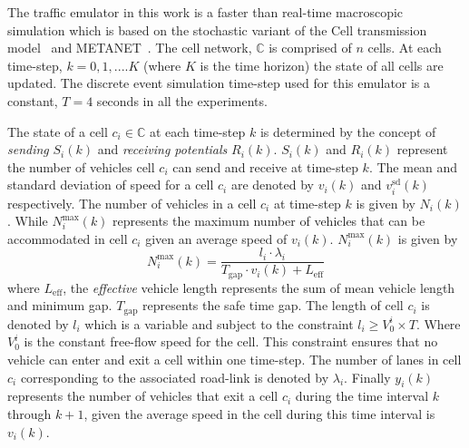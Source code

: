 \documentclass{sig-alternate-05-2015}
\begin{document}
The traffic emulator in this work is a faster than real-time macroscopic simulation which is based on the stochastic variant of the Cell transmission model~\cite{boel2006compositional} and METANET~\cite{kotsialos2002traffic}. The cell network, $\mathbb{C}$ is comprised of $n$ cells. At each time-step, $k=0,1, .... K$ (where $K$ is the time horizon) the state of all cells are updated. The discrete event simulation time-step used for this emulator is a constant, $T=4$ seconds in all the experiments.
  
The state of a cell $c_i\in \mathbb{C}$ at each time-step $k$ is determined by the concept of {\it sending} $S_i(k)$ and {\it receiving potentials} $R_i(k)$. $S_i(k)$ and $R_i(k)$ represent the number of vehicles cell $c_i$ can send and receive at time-step $k$. The mean and standard deviation of speed for a cell $c_i$ are denoted by $v_i(k)$ and $v_i^{\text{sd}}(k)$ respectively.  The number of vehicles in a cell $c_i$ at time-step $k$ is given by $N_{i}(k)$. While $N_i^{\text{max}}(k)$ represents the maximum number of vehicles that can be accommodated in cell $c_i$ given an average speed of $v_i(k)$. $N_i^{\text{max}}(k)$ is given by
\begin{equation}
\label{eq:nmax}
N_i^{\text{max}}(k)=\frac{l_i\cdot \lambda_i}{T_{\text{gap}}\cdot v_{i}(k)+ L_{\text{eff}}}
\end{equation}
where $L_{\text{eff}}$, the {\it effective} vehicle length represents the sum of mean vehicle length and minimum gap. $T_{\text{gap}}$ represents the safe time gap.
The length of cell $c_i$ is denoted by $l_i$ which is a variable and subject to the constraint $l_i \ge V_0^i\times T$. Where $V_0^i$ is the constant free-flow speed for the cell. This constraint ensures that no vehicle can enter and exit a cell within one time-step. The number of lanes in cell $c_i$ corresponding to the associated road-link is denoted by $\lambda_i$.  Finally $y_i(k)$ represents the number of vehicles that exit a cell $c_i$ during the time interval $k$ through $k+1$, given the average speed in the cell during this time interval is $v_i(k)$.
\end{document}
